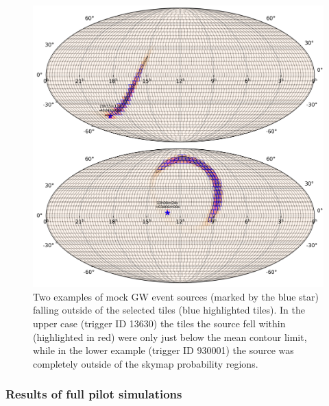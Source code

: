 \begin{colsection}
\begin{colsection}
\begin{figure}[p]
\begin{center}
\includegraphics[width=\linewidth]{images/non_selected.pdf}
\end{center}

\caption[Examples of mock GW event sources falling outside of the selected tiles]{Two examples of mock GW event sources (marked by the blue star) falling outside of the selected tiles (blue highlighted tiles). In the upper case (trigger ID 13630) the tiles the source fell within (highlighted in red) were only just below the mean contour limit, while in the lower example (trigger ID 930001) the source was completely outside of the skymap probability regions.
}
\label{fig:poor_selection}
\end{figure}

\clearpage

\subsubsection{Results of full pilot simulations}


\end{colsection}
\end{colsection}
